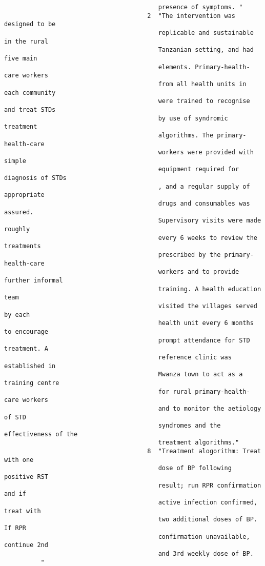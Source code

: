 \documentclass{article}
\begin{document}
\begin{verbatim}
                                          presence of symptoms. "
                                       2  "The intervention was designed to be
                                          replicable and sustainable in the rural
                                          Tanzanian setting, and had five main
                                          elements. Primary-health-care workers
                                          from all health units in each community
                                          were trained to recognise and treat STDs
                                          by use of syndromic treatment
                                          algorithms. The primary-health-care
                                          workers were provided with simple
                                          equipment required for diagnosis of STDs
                                          , and a regular supply of appropriate
                                          drugs and consumables was assured.
                                          Supervisory visits were made roughly
                                          every 6 weeks to review the treatments
                                          prescribed by the primary-health-care
                                          workers and to provide further informal
                                          training. A health education team
                                          visited the villages served by each
                                          health unit every 6 months to encourage
                                          prompt attendance for STD treatment. A
                                          reference clinic was established in
                                          Mwanza town to act as a training centre
                                          for rural primary-health-care workers
                                          and to monitor the aetiology of STD
                                          syndromes and the effectiveness of the
                                          treatment algorithms."
                                       8  "Treatment alogorithm: Treat with one
                                          dose of BP following positive RST
                                          result; run RPR confirmation and if
                                          active infection confirmed, treat with
                                          two additional doses of BP. If RPR
                                          confirmation unavailable, continue 2nd
                                          and 3rd weekly dose of BP.
          "
          

\end{verbatim}
\end{document}
